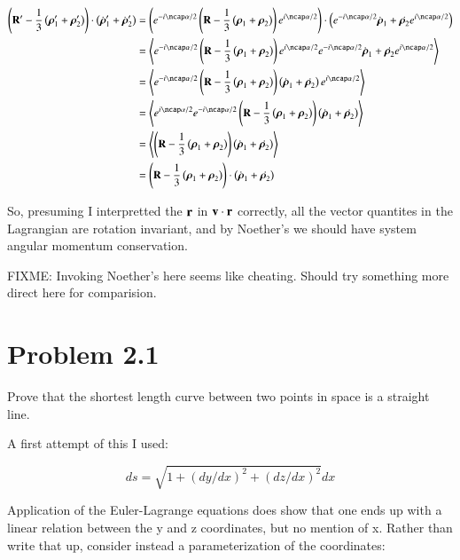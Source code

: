 \documentclass{article}
\newcommand{\Brho}[0]{\boldsymbol{\rho}}
\newcommand{\gpgrade}[2] {{\left\langle{{#1}}\right\rangle}_{#2}}
\newcommand{\gpgradezero}[1] {\gpgrade{#1}{}}
\begin{document}
\begin{align*}
\left( \BR' - \inv{3}\left(\Brho_1' + \Brho_2'\right) \right) \cdot \left({\dot{\Brho}}_1' + {\dot{\Brho}}_2'\right) 
&= 
\left(e^{-i\ncap \alpha/2} \left( \BR - \inv{3}\left(\Brho_1 + \Brho_2\right) \right) e^{i\ncap\alpha/2}\right) \cdot
\left(e^{-i\ncap \alpha/2} \dot{\Brho}_1 + \dot{\Brho_2} e^{i\ncap\alpha/2}\right) \\
&= 
\gpgradezero{
e^{-i\ncap \alpha/2} \left( \BR - \inv{3}\left(\Brho_1 + \Brho_2\right) \right) e^{i\ncap\alpha/2}
e^{-i\ncap \alpha/2} \dot{\Brho}_1 + \dot{\Brho_2} e^{i\ncap\alpha/2}
} \\
&= 
\gpgradezero{
e^{-i\ncap \alpha/2} \left( \BR - \inv{3}\left(\Brho_1 + \Brho_2\right) \right) \left(\dot{\Brho}_1 + \dot{\Brho_2}\right) e^{i\ncap\alpha/2}
} \\
&= 
\gpgradezero{
e^{i\ncap\alpha/2}
e^{-i\ncap \alpha/2} \left( \BR - \inv{3}\left(\Brho_1 + \Brho_2\right) \right) \left(\dot{\Brho}_1 + \dot{\Brho_2}\right) 
} \\
&= 
\gpgradezero{
\left( \BR - \inv{3}\left(\Brho_1 + \Brho_2\right) \right) \left(\dot{\Brho}_1 + \dot{\Brho_2}\right) 
} \\
&= 
\left( \BR - \inv{3}\left(\Brho_1 + \Brho_2\right) \right) \cdot \left(\dot{\Brho}_1 + \dot{\Brho_2}\right) 
\end{align*}

So, presuming I interpretted the $\mathbf{r}$ in $\mathbf{v} \cdot \mathbf{r}$ correctly,
all the vector quantites in the Lagrangian are rotation invariant, and by Noether's we should have system angular momentum 
conservation.

FIXME: Invoking Noether's here seems like cheating.  Should try something more direct here for comparision.

\section{ Problem 2.1 }

Prove that the shortest length curve between two points in space is a straight line.

A first attempt of this I used:

\begin{equation*}
ds = \sqrt{ 1 + (dy/dx)^2 + (dz/dx)^2 } dx
\end{equation*}

Application of the Euler-Lagrange equations does show that one ends up with a linear relation between the y and z coordinates, but no mention of x.  Rather than write that up, consider instead a parameterization of the coordinates:
\end{document}
